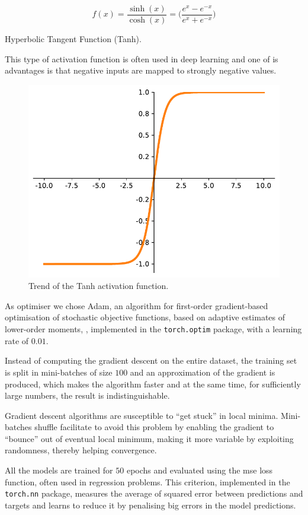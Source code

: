\begin{Equation}[H]
	\centering
	\begin{equation}
	f(x)= \frac{\sinh (x)}{\cosh (x)} = \bigg( \frac{e^x - e^{-x}}{e^x + 
		e^{-x}}\bigg)
	\end{equation}
	\caption{Hyperbolic Tangent Function (Tanh).}
	\label{eq:tanh}
\end{Equation}

This type of activation function is often used in deep learning and one of is 
advantages is that negative inputs are mapped to strongly negative values.

\begin{figure}[!htb]
	\centering
	\includegraphics[width=.5\textwidth]{contents/images/tanh2}%
	\caption{Trend of the Tanh activation function.}
	\label{fig:tanh}
\end{figure}

As optimiser we chose Adam, {an algorithm for first-order gradient-based 
optimisation of stochastic objective functions, based on adaptive estimates of 
lower-order moments}, \cite[see][]{kingma2014adam, 
loshchilov2017decoupled}, 
implemented in the \texttt{torch.optim} package, with a learning rate of $0.01$. 

Instead of computing the gradient descent on the entire dataset, the training set is 
split in mini-batches of size $100$ and an approximation of the gradient is 
produced, which makes the algorithm faster and at the same time, for sufficiently 
large numbers, the result is indistinguishable.

Gradient descent algorithms are susceptible to ``get stuck'' in local minima.
Mini-batches shuffle facilitate to avoid this problem by enabling the gradient to 
``bounce'' out of eventual local minimum, making it more variable by exploiting 
randomness, thereby helping convergence.

All the models are trained for $50$ epochs and evaluated using the \gls{mse} loss 
function, often used in regression problems. 
This criterion, implemented in the \texttt{torch.nn} package, measures the 
average of squared error between predictions and targets and learns to reduce it 
by penalising big errors in the model predictions.

